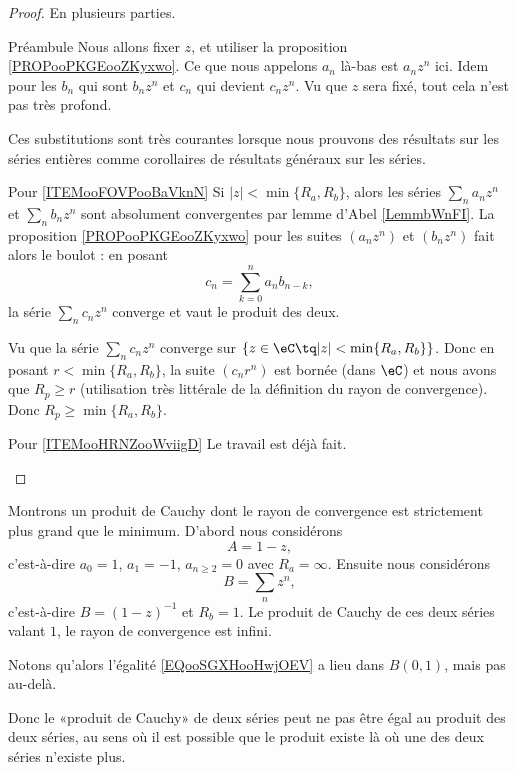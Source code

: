 \begin{proof}
    En plusieurs parties.
    \begin{subproof}
        \item[Préambule]
            Nous allons fixer \( z\), et utiliser la proposition \ref{PROPooPKGEooZKyxwo}. Ce que nous appelons \( a_n\) là-bas est \( a_nz^n\) ici. Idem pour les \( b_n\) qui sont \( b_nz^n\) et \( c_n\) qui devient \( c_nz^n\). Vu que \( z\) sera fixé, tout cela n'est pas très profond.

            Ces substitutions sont très courantes lorsque nous prouvons des résultats sur les séries entières comme corollaires de résultats généraux sur les séries.
        \item[Pour \ref{ITEMooFOVPooBaVknN}]
            Si \( | z |<\min\{ R_a,R_b \}\), alors les séries \( \sum_na_nz^n\) et \( \sum_nb_nz^n\) sont absolument convergentes par lemme d'Abel \ref{LemmbWnFI}. La proposition \ref{PROPooPKGEooZKyxwo} pour les suites \( (a_nz^n)\) et \( (b_nz^n)\) fait alors le boulot : en posant 
            \begin{equation}
                c_n=\sum_{k=0}^na_nb_{n-k},
            \end{equation}
            la série \( \sum_nc_nz^n\) converge et vaut le produit des deux.

            Vu que la série \( \sum_nc_nz^n\) converge sur \( \{ z\in \eC\tq | z |<\min\{ R_a,R_b \} \}\). Donc en posant \( r<\min\{ R_a,R_b \}\), la suite \( (c_nr^n)\) est bornée (dans \( \eC\)) et nous avons que \( R_p\geq r\) (utilisation très littérale de la définition du rayon de convergence). Donc \( R_p\geq\min \{ R_a,R_b \}\).
        \item[Pour \ref{ITEMooHRNZooWviigD}]
            Le travail est déjà fait.
    \end{subproof}
\end{proof}

\begin{example}
    Montrons un produit de Cauchy dont le rayon de convergence est strictement plus grand que le minimum. D'abord nous considérons
    \begin{equation}
        A=1-z,
    \end{equation}
    c'est-à-dire \( a_0=1\), \( a_1=-1\), \( a_{n\geq 2}=0\) avec \( R_a=\infty\). Ensuite nous considérons
    \begin{equation}
        B=\sum_nz^n,
    \end{equation}
    c'est-à-dire \( B=(1-z)^{-1}\) et \( R_b=1\). Le produit de Cauchy de ces deux séries valant \( 1\), le rayon de convergence est infini.

    Notons qu'alors l'égalité \eqref{EQooSGXHooHwjOEV} a lieu dans \( B(0,1)\), mais pas au-delà.

    Donc le «produit de Cauchy» de deux séries peut ne pas être égal au produit des deux séries, au sens où il est possible que le produit existe là où une des deux séries n'existe plus.
\end{example}

